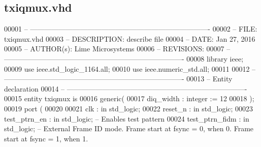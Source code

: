 \subsection{txiqmux.\+vhd}
\label{txiqmux_8vhd_source}

\begin{DoxyCode}
00001 \textcolor{keyword}{-- ---------------------------------------------------------------------------- }
00002 \textcolor{keyword}{-- FILE:    txiqmux.vhd}
00003 \textcolor{keyword}{-- DESCRIPTION: describe file}
00004 \textcolor{keyword}{-- DATE:    Jan 27, 2016}
00005 \textcolor{keyword}{-- AUTHOR(s):   Lime Microsystems}
00006 \textcolor{keyword}{-- REVISIONS:}
00007 \textcolor{keyword}{-- ---------------------------------------------------------------------------- }
00008 \textcolor{vhdlkeyword}{library }\textcolor{keywordflow}{ieee};
00009 \textcolor{vhdlkeyword}{use }ieee.std\_logic\_1164.\textcolor{keywordflow}{all};
00010 \textcolor{vhdlkeyword}{use }ieee.numeric\_std.\textcolor{keywordflow}{all};
00011 
00012 \textcolor{keyword}{-- ----------------------------------------------------------------------------}
00013 \textcolor{keyword}{-- Entity declaration}
00014 \textcolor{keyword}{-- ----------------------------------------------------------------------------}
00015 \textcolor{keywordflow}{entity }txiqmux \textcolor{keywordflow}{is}
00016    \textcolor{keywordflow}{generic}\textcolor{vhdlchar}{(}
00017       \textcolor{vhdlchar}{diq_width}   \textcolor{vhdlchar}{:} \textcolor{comment}{integer} \textcolor{vhdlchar}{:=} \textcolor{vhdllogic}{}\textcolor{vhdllogic}{12}
00018    \textcolor{vhdlchar}{)};
00019    \textcolor{keywordflow}{port} \textcolor{vhdlchar}{(}
00020 
00021       \textcolor{vhdlchar}{clk}               \textcolor{vhdlchar}{:} \textcolor{keywordflow}{in} \textcolor{comment}{std\_logic};
00022       \textcolor{vhdlchar}{reset_n}           \textcolor{vhdlchar}{:} \textcolor{keywordflow}{in} \textcolor{comment}{std\_logic};
00023       \textcolor{vhdlchar}{test_ptrn_en}      \textcolor{vhdlchar}{:} \textcolor{keywordflow}{in} \textcolor{comment}{std\_logic};\textcolor{keyword}{   -- Enables test pattern}
00024       \textcolor{vhdlchar}{test_ptrn_fidm}    \textcolor{vhdlchar}{:} \textcolor{keywordflow}{in} \textcolor{comment}{std\_logic};\textcolor{keyword}{   -- External Frame ID mode. Frame start at fsync = 0, when 0.
       Frame start at fsync = 1, when 1.}

\end{DoxyCode}
